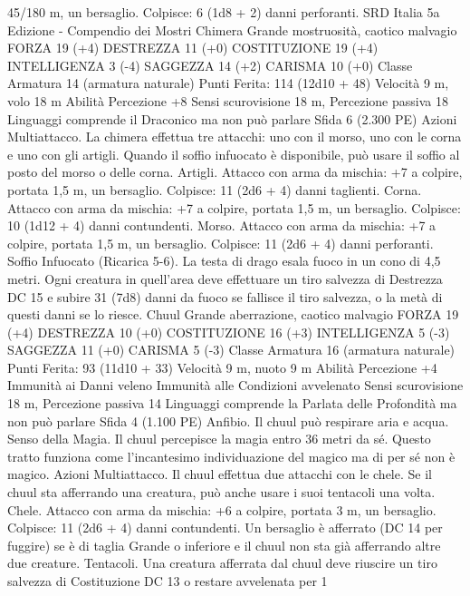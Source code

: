 \begin{multicols}{2}
45/180 m, un bersaglio.
Colpisce: 6 (1d8 + 2) danni perforanti.
SRD Italia 5a Edizione - Compendio dei Mostri
Chimera
Grande mostruosità, caotico malvagio
FORZA 19 (+4)
DESTREZZA 11 (+0)
COSTITUZIONE 19 (+4)
INTELLIGENZA 3 (-4)
SAGGEZZA 14 (+2)
CARISMA 10 (+0)
Classe Armatura 14 (armatura naturale)
\hspace*{0pt}\hfill{Punti Ferita}: 114 (12d10 + 48)
Velocità 9 m, volo 18 m
Abilità Percezione +8
Sensi scurovisione 18 m, Percezione passiva 18
Linguaggi comprende il Draconico ma non può parlare
Sfida 6 (2.300 PE)
Azioni
Multiattacco. La chimera effettua tre attacchi: uno con il morso,
uno con le corna e uno con gli artigli. Quando il soffio infuocato
è disponibile, può usare il soffio al posto del morso o delle corna.
Artigli. Attacco con arma da mischia: +7 a colpire, portata 1,5
m, un bersaglio.
Colpisce: 11 (2d6 + 4) danni taglienti.
Corna. Attacco con arma da mischia: +7 a colpire, portata 1,5 m,
un bersaglio.
Colpisce: 10 (1d12 + 4) danni contundenti.
Morso. Attacco con arma da mischia: +7 a colpire, portata 1,5
m, un bersaglio.
Colpisce: 11 (2d6 + 4) danni perforanti.
Soffio Infuocato (Ricarica 5-6). La testa di drago esala fuoco in
un cono di 4,5 metri. Ogni creatura in quell’area deve effettuare
un tiro salvezza di Destrezza DC 15 e subire 31 (7d8) danni da
fuoco se fallisce il tiro salvezza, o la metà di questi danni se lo
riesce.
Chuul
Grande aberrazione, caotico malvagio
FORZA 19 (+4)
DESTREZZA 10 (+0)
COSTITUZIONE 16 (+3)
INTELLIGENZA 5 (-3)
SAGGEZZA 11 (+0)
CARISMA 5 (-3)
Classe Armatura 16 (armatura naturale)
\hspace*{0pt}\hfill{Punti Ferita}: 93 (11d10 + 33)
Velocità 9 m, nuoto 9 m
Abilità Percezione +4
Immunità ai Danni veleno
Immunità alle Condizioni avvelenato
Sensi scurovisione 18 m, Percezione passiva 14
Linguaggi comprende la Parlata delle Profondità ma non può
parlare
Sfida 4 (1.100 PE)
Anfibio. Il chuul può respirare aria e acqua.
Senso della Magia. Il chuul percepisce la magia entro 36 metri
da sé. Questo tratto funziona come l’incantesimo individuazione
del magico ma di per sé non è magico.
Azioni
Multiattacco. Il chuul effettua due attacchi con le chele. Se il
chuul sta afferrando una creatura, può anche usare i suoi
tentacoli una volta.
Chele. Attacco con arma da mischia: +6 a colpire, portata 3 m,
un bersaglio.
Colpisce: 11 (2d6 + 4) danni contundenti. Un bersaglio è
afferrato (DC 14 per fuggire) se è di taglia Grande o inferiore e il
chuul non sta già afferrando altre due creature.
Tentacoli. Una creatura afferrata dal chuul deve riuscire un tiro
salvezza di Costituzione DC 13 o restare avvelenata per 1

\end{multicols}
